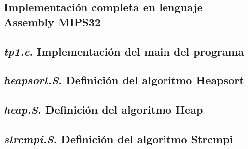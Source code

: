 \documentclass{article}
\begin{document}
\begin{appendices}
\section{Implementación completa en lenguaje Assembly MIPS32}


\subsection{\textit{tp1.c}. Implementación del main del programa}
\lstset{ language =C } %
 
\bigskip\bigskip

\subsection{\textit{heapsort.S}. Definición del algoritmo Heapsort}
\lstset{ language = [mips]Assembler} %
 
\bigskip\bigskip

\subsection{\textit{heap.S}. Definición del algoritmo Heap}
\lstset{ language = [mips]Assembler} %
 
\bigskip\bigskip

\subsection{\textit{strcmpi.S}. Definición del algoritmo Strcmpi}
\lstset{ language = [mips]Assembler} %
 
\bigskip\bigskip


\end{appendices}
\end{document}
